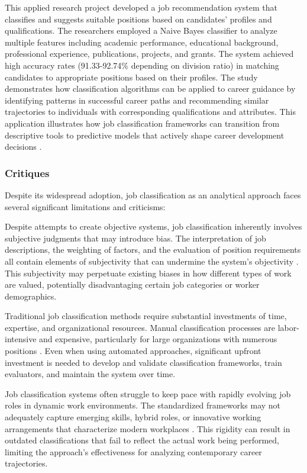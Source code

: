 \documentclass[../main.tex]{subfiles}
\begin{document}
This applied research project developed a job recommendation system that classifies and suggests suitable positions based on candidates' profiles and qualifications. The researchers employed a Naive Bayes classifier to analyze multiple features including academic performance, educational background, professional experience, publications, projects, and grants. The system achieved high accuracy rates (91.33-92.74\% depending on division ratio) in matching candidates to appropriate positions based on their profiles. The study demonstrates how classification algorithms can be applied to career guidance by identifying patterns in successful career paths and recommending similar trajectories to individuals with corresponding qualifications and attributes. This application illustrates how job classification frameworks can transition from descriptive tools to predictive models that actively shape career development decisions \cite{jeesr2021}.

\subsubsection{Critiques}

Despite its widespread adoption, job classification as an analytical approach faces several significant limitations and criticisms:

Despite attempts to create objective systems, job classification inherently involves subjective judgments that may introduce bias. The interpretation of job descriptions, the weighting of factors, and the evaluation of position requirements all contain elements of subjectivity that can undermine the system's objectivity \cite{haygroup2024}. This subjectivity may perpetuate existing biases in how different types of work are valued, potentially disadvantaging certain job categories or worker demographics.

Traditional job classification methods require substantial investments of time, expertise, and organizational resources. Manual classification processes are labor-intensive and expensive, particularly for large organizations with numerous positions \cite{ikudo2018}. Even when using automated approaches, significant upfront investment is needed to develop and validate classification frameworks, train evaluators, and maintain the system over time.

Job classification systems often struggle to keep pace with rapidly evolving job roles in dynamic work environments. The standardized frameworks may not adequately capture emerging skills, hybrid roles, or innovative working arrangements that characterize modern workplaces \cite{deel2024}. This rigidity can result in outdated classifications that fail to reflect the actual work being performed, limiting the approach's effectiveness for analyzing contemporary career trajectories.
\end{document}
